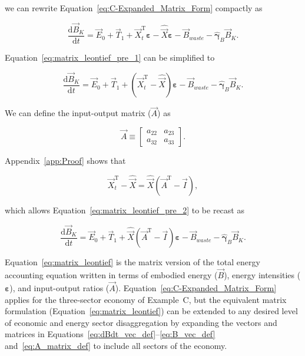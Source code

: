 \noindent{}we can rewrite Equation~\ref{eq:C-Expanded_Matrix_Form}
compactly as

\begin{equation} \label{eq:matrix_leontief_pre_1}
	\frac{\mathrm{d}\vec{B}_{K}}{\mathrm{d}t} 
	= \vec{E}_{0}
	+ \vec{T}_{1}
	+ \vec{X}_{t}^{\mathrm{T}}\bm{\varepsilon} 
	- \hat{\vec{X}}\bm{\varepsilon}
	- \vec{B}_{waste}
	- \hat{\bm{\gamma}}_{B} \vec{B}_{K}.
\end{equation}

\noindent{}Equation~\ref{eq:matrix_leontief_pre_1} can be simplified to

\begin{equation} \label{eq:matrix_leontief_pre_2}
	\frac{\mathrm{d}\vec{B}_{K}}{\mathrm{d}t} 
	= \vec{E}_{0}
	+ \vec{T}_{1}
	+ (\vec{X}_{t}^{\mathrm{T}} - \hat{\vec{X}})\bm{\varepsilon} 
	- \vec{B}_{waste}
	- \hat{\bm{\gamma}}_{B}\vec{B}_{K}.
\end{equation}

\noindent{}We can define the input-output matrix ($\vec{A}$) as

\begin{equation} \label{eq:A_matrix_def}
	\vec{A} 
	\equiv
	\begin{bmatrix}
		a_{22} & a_{23}	\\
		a_{32} & a_{33}	
	\end{bmatrix}.
\end{equation} 

\noindent{}Appendix~\ref{app:Proof} shows that

\begin{equation} \label{eq:Xdifference1}
	\vec{X}_{t}^{\mathrm{T}} 
	- \hat{\vec{X}} 
	= \hat{\vec{X}} (\vec{A}^{\mathrm{T}} - \vec{I}),
\end{equation}

\noindent{}which allows Equation~\ref{eq:matrix_leontief_pre_2}
to be recast as

\begin{equation} \label{eq:matrix_leontief}
	\frac{\mathrm{d}\vec{B}_{K}}{\mathrm{d}t} 
	= \vec{E}_{0}
	+ \vec{T}_{1}
	+ \hat{\vec{X}} (\vec{A}^{\mathrm{T}} - \vec{I})\bm{\varepsilon} 
	- \vec{B}_{waste}
	- \hat{\bm{\gamma}}_{B}\vec{B}_{K}.
\end{equation}

\noindent{}Equation~\ref{eq:matrix_leontief} is the matrix version 
of the total energy accounting equation
written in terms of embodied energy ($\vec{B}$), 
energy intensities ($\bm{\varepsilon}$),
and input-output ratios ($\vec{A}$).
Equation~\ref{eq:C-Expanded_Matrix_Form} applies 
for the three-sector economy of Example~C, 
but the equivalent matrix formulation (Equation~\ref{eq:matrix_leontief}) 
can be extended to any desired level 
of economic and energy sector disaggregation 
by expanding the vectors and matrices in 
Equations~\ref{eq:dBdt_vec_def}--\ref{eq:B_vec_def}
and~\ref{eq:A_matrix_def} to include
all sectors of the economy.\cite{Bullard:1978vd,Casler1984}

